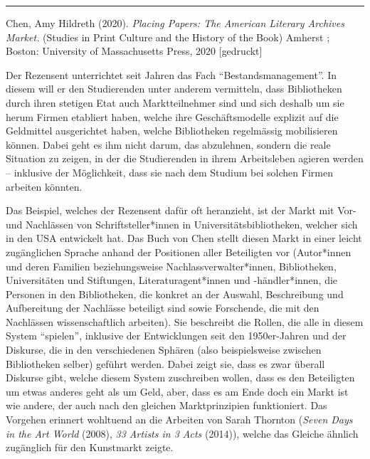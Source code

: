 \documentclass[a4paper,
fontsize=11pt,
oneside,
numbers=noperiodatend,
parskip=half-,
bibliography=totoc,
final
]{scrartcl}
\begin{document}
\begin{center}\rule{0.5\linewidth}{0.5pt}\end{center}

Chen, Amy Hildreth (2020). \emph{Placing Papers: The American Literary
Archives Market.} (Studies in Print Culture and the History of the Book)
Amherst ; Boston: University of Massachusetts Press, 2020 {[}gedruckt{]}

Der Rezensent unterrichtet seit Jahren das Fach
\enquote{Bestandsmanagement}. In diesem will er den Studierenden unter
anderem vermitteln, dass Bibliotheken durch ihren stetigen Etat auch
Marktteilnehmer sind und sich deshalb um sie herum Firmen etabliert
haben, welche ihre Geschäftsmodelle explizit auf die Geldmittel
ausgerichtet haben, welche Bibliotheken regelmässig mobilisieren können.
Dabei geht es ihm nicht darum, das abzulehnen, sondern die reale
Situation zu zeigen, in der die Studierenden in ihrem Arbeitsleben
agieren werden -- inklusive der Möglichkeit, dass sie nach dem Studium
bei solchen Firmen arbeiten könnten.

Das Beispiel, welches der Rezensent dafür oft heranzieht, ist der Markt
mit Vor- und Nachlässen von Schriftsteller*innen in
Universitätsbibliotheken, welcher sich in den USA entwickelt hat. Das
Buch von Chen stellt diesen Markt in einer leicht zugänglichen Sprache
anhand der Positionen aller Beteiligten vor (Autor*innen und deren
Familien beziehungsweise Nachlassverwalter*innen, Bibliotheken,
Universitäten und Stiftungen, Literaturagent*innen und -händler*innen,
die Personen in den Bibliotheken, die konkret an der Auswahl,
Beschreibung und Aufbereitung der Nachlässe beteiligt sind sowie
Forschende, die mit den Nachlässen wissenschaftlich arbeiten). Sie
beschreibt die Rollen, die alle in diesem System \enquote{spielen},
inklusive der Entwicklungen seit den 1950er-Jahren und der Diskurse, die
in den verschiedenen Sphären (also beispielsweise zwischen Bibliotheken
selber) geführt werden. Dabei zeigt sie, dass es zwar überall Diskurse
gibt, welche diesem System zuschreiben wollen, dass es den Beteiligten
um etwas anderes geht als um Geld, aber, dass es am Ende doch ein Markt
ist wie andere, der auch nach den gleichen Marktprinzipien funktioniert.
Das Vorgehen erinnert wohltuend an die Arbeiten von Sarah Thornton
(\emph{Seven Days in the Art World} (2008), \emph{33 Artists in 3 Acts}
(2014)), welche das Gleiche ähnlich zugänglich für den Kunstmarkt
zeigte.
\end{document}

